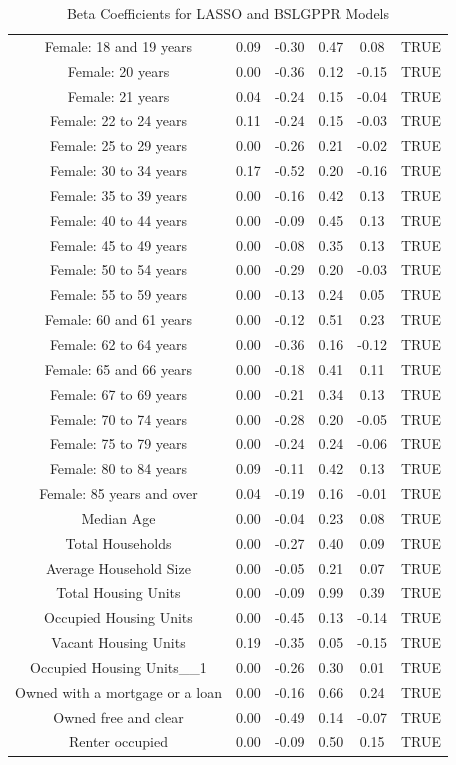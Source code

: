 \documentclass{article} %
\begin{document}
\begin{table}[H]
\begin{adjustbox}{width = \textwidth, height = \textheight}
\begin{tabular}{cccccc}
  Female: 18 and 19 years & 0.09 & -0.30 & 0.47 & 0.08 & TRUE \\ 
  Female: 20 years & 0.00 & -0.36 & 0.12 & -0.15 & TRUE \\ 
  Female: 21 years & 0.04 & -0.24 & 0.15 & -0.04 & TRUE \\ 
  Female: 22 to 24 years & 0.11 & -0.24 & 0.15 & -0.03 & TRUE \\ 
  Female: 25 to 29 years & 0.00 & -0.26 & 0.21 & -0.02 & TRUE \\ 
  Female: 30 to 34 years & 0.17 & -0.52 & 0.20 & -0.16 & TRUE \\ 
  Female: 35 to 39 years & 0.00 & -0.16 & 0.42 & 0.13 & TRUE \\ 
  Female: 40 to 44 years & 0.00 & -0.09 & 0.45 & 0.13 & TRUE \\ 
  Female: 45 to 49 years & 0.00 & -0.08 & 0.35 & 0.13 & TRUE \\ 
  Female: 50 to 54 years & 0.00 & -0.29 & 0.20 & -0.03 & TRUE \\ 
  Female: 55 to 59 years & 0.00 & -0.13 & 0.24 & 0.05 & TRUE \\ 
  Female: 60 and 61 years & 0.00 & -0.12 & 0.51 & 0.23 & TRUE \\ 
  Female: 62 to 64 years & 0.00 & -0.36 & 0.16 & -0.12 & TRUE \\ 
  Female: 65 and 66 years & 0.00 & -0.18 & 0.41 & 0.11 & TRUE \\ 
  Female: 67 to 69 years & 0.00 & -0.21 & 0.34 & 0.13 & TRUE \\ 
  Female: 70 to 74 years & 0.00 & -0.28 & 0.20 & -0.05 & TRUE \\ 
  Female: 75 to 79 years & 0.00 & -0.24 & 0.24 & -0.06 & TRUE \\ 
  Female: 80 to 84 years & 0.09 & -0.11 & 0.42 & 0.13 & TRUE \\ 
  Female: 85 years and over & 0.04 & -0.19 & 0.16 & -0.01 & TRUE \\ 
  Median Age & 0.00 & -0.04 & 0.23 & 0.08 & TRUE \\ 
  Total Households & 0.00 & -0.27 & 0.40 & 0.09 & TRUE \\ 
  Average Household Size & 0.00 & -0.05 & 0.21 & 0.07 & TRUE \\ 
  Total Housing Units & 0.00 & -0.09 & 0.99 & 0.39 & TRUE \\ 
  Occupied Housing Units & 0.00 & -0.45 & 0.13 & -0.14 & TRUE \\ 
  Vacant Housing Units & 0.19 & -0.35 & 0.05 & -0.15 & TRUE \\ 
  Occupied Housing Units\_\_1 & 0.00 & -0.26 & 0.30 & 0.01 & TRUE \\ 
  Owned with a mortgage or a loan & 0.00 & -0.16 & 0.66 & 0.24 & TRUE \\ 
  Owned free and clear & 0.00 & -0.49 & 0.14 & -0.07 & TRUE \\ 
  Renter occupied & 0.00 & -0.09 & 0.50 & 0.15 & TRUE \\ 
   \hline
\end{tabular}
\end{adjustbox}
\caption{Beta Coefficients for LASSO and BSLGPPR Models}
\label{table:betacoef}
\end{table}
\end{document}
